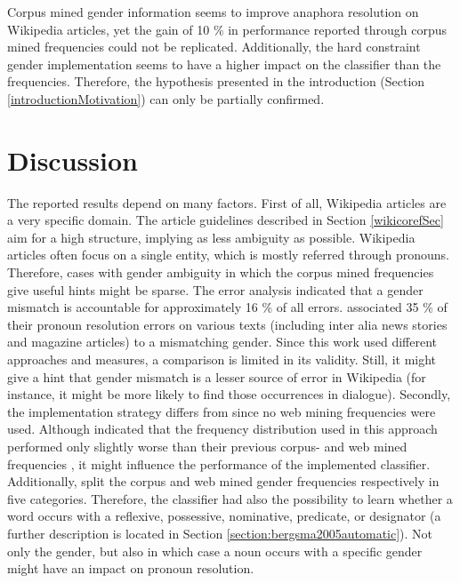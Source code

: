 Corpus mined gender information seems to improve anaphora resolution on Wikipedia articles, yet the gain of 10 \% in performance \cite{bergsma2005automatic} reported through corpus mined frequencies could not be replicated. Additionally, the hard constraint gender implementation seems to have a higher impact on the classifier than the frequencies. Therefore, the hypothesis presented in the introduction (Section \ref{introductionMotivation}) can only be partially confirmed. 

\section{Discussion}
The reported results depend on many factors. First of all, Wikipedia articles are a very specific domain. The article guidelines described in Section \ref{wikicorefSec} aim for a high structure, implying as less ambiguity as possible. Wikipedia articles often focus on a single entity, which is mostly referred through pronouns. Therefore, cases with gender ambiguity in which the corpus mined frequencies give useful hints might be sparse. The error analysis indicated that a gender mismatch is accountable for approximately 16 \% of all errors. \cite{kennedy1996anaphora} associated 35 \% of their pronoun resolution errors on various texts (including inter alia news stories and magazine articles) to a mismatching gender. Since this work used different approaches and measures, a comparison is limited in its validity. Still, it might give a hint that gender mismatch is a lesser source of error in Wikipedia (for instance, it might be more likely to find those occurrences in dialogue).
Secondly, the implementation strategy differs from \cite{bergsma2005automatic} since no web mining frequencies were used. Although \cite{Bergsma:06} indicated that the frequency distribution used in this approach performed only slightly worse than their previous corpus- and web mined frequencies \citep{bergsma2005automatic}, it might influence the performance of the implemented classifier.\\
Additionally, \cite{bergsma2005automatic} split the corpus and web mined gender frequencies respectively in five categories. Therefore, the classifier had also the possibility to learn whether a word occurs with a reflexive, possessive, nominative, predicate, or designator (a further description is located in Section  \ref{section:bergsma2005automatic}). Not only the gender, but also in which case a noun occurs with a specific gender might have an impact on pronoun resolution.

